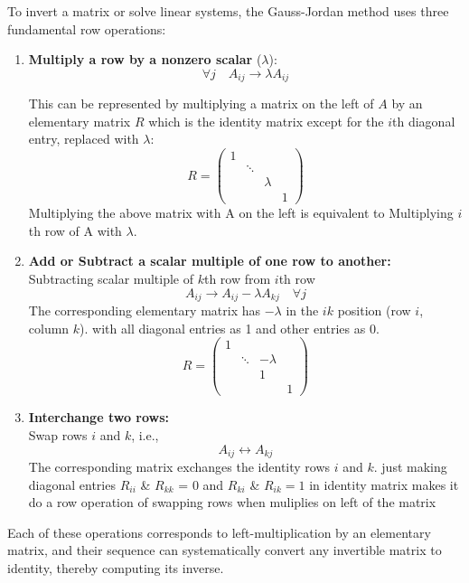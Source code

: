 \documentclass[12pt, a4paper]{report}
\begin{document}
To invert a matrix or solve linear systems, the Gauss-Jordan method uses three fundamental row operations:
\begin{enumerate}
    \item \textbf{Multiply a row by a nonzero scalar} ($\lambda$):\\
    $$
    \forall j \quad A_{ij} \to \lambda A_{ij}
    $$

    This can be represented by multiplying a matrix on the left of $A$ by an elementary matrix $R$ which is the identity matrix except for the $i$th diagonal entry, replaced with $\lambda$:
    \[
    R = 
    \begin{pmatrix}
    1 &        &        &       \\
      & \ddots &        &       \\
      &        & \lambda &      \\
      &        &        & 1
    \end{pmatrix}
    \]
    Multiplying the above matrix with A on the left is equivalent to Multiplying $i$th row of A with $\lambda$.

    \item \textbf{Add or Subtract a scalar multiple of one row to another:}\\

    Subtracting scalar multiple of $k$th row from $i$th row
    \[
    A_{ij} \to A_{ij} - \lambda A_{kj}\quad \forall j
    \]
    The corresponding elementary matrix has $- \lambda$ in the $ik$ position (row $i$, column $k$).
    with all diagonal entries as 1 and other entries as 0.
    \[
    R = 
    \begin{pmatrix}
    1 &        &         &      \\
      & \ddots & -\lambda &      \\
      &        &   1       &      \\
      &        &         & 1    
    \end{pmatrix}
    \]
    \item \textbf{Interchange two rows:}\\
    Swap rows $i$ and $k$, i.e.,
    \[
    A_{ij} \leftrightarrow A_{kj}
    \]
    The corresponding matrix exchanges the identity rows $i$ and $k$. just making diagonal entries $R_{ii}$ \& $R_{kk}$ = 0 and $R_{ki}$ \& $R_{ik} = 1$ in identity matrix makes it do a row operation of swapping rows when muliplies on left of the matrix
\end{enumerate}

Each of these operations corresponds to left-multiplication by an elementary matrix, and their sequence can systematically convert any invertible matrix to identity, thereby computing its inverse.
\end{document}

